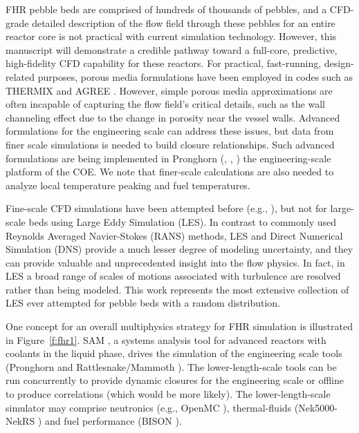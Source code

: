 FHR pebble beds are comprised of hundreds of thousands of pebbles, and a CFD-grade detailed description of the flow field through these pebbles for an entire reactor core is not practical with current simulation technology. However, this manuscript will demonstrate a credible pathway toward a full-core, predictive, high-fidelity CFD capability for these reactors. For practical, fast-running, design-related purposes, porous media formulations have been employed in codes such as THERMIX \cite{cleveland1986application} and AGREE \cite{seker2007multiphysics}. However, simple porous media approximations are often incapable of capturing the flow field's critical details, such as the wall channeling effect due to the change in porosity near the vessel walls.  Advanced formulations for the engineering scale can address these issues, but data from finer scale simulations is needed to build closure relationships. Such advanced formulations are being implemented in  Pronghorn (\cite{novak2018pronghorn}, \cite{novak1}, \cite{novak2}) the engineering-scale platform of the COE. We note that finer-scale calculations are also needed to analyze local temperature peaking and fuel temperatures.

Fine-scale CFD simulations have been attempted before (e.g., \cite{vanstaden2018}), but not for large-scale beds using Large Eddy Simulation (LES).  In contrast to commonly used  Reynolds Averaged Navier-Stokes (RANS) methods, LES and Direct Numerical Simulation (DNS) provide a much lesser degree of modeling uncertainty, and they can provide valuable and unprecedented insight into the flow physics. In fact, in LES a broad range of scales of motions associated with turbulence are resolved rather than being modeled. This work represents the most extensive collection of LES ever attempted for pebble beds with a random distribution.

One concept for an overall multiphysics strategy for FHR simulation is illustrated in Figure~\ref{f:fhr1}. SAM \cite{hu2017sam}, a systems analysis tool for advanced reactors with coolants in the liquid phase, drives the simulation of the engineering scale tools (Pronghorn and Rattlesnake/Mammoth \cite{wang1}). The lower-length-scale tools can be run concurrently to provide dynamic closures for the engineering scale or offline to produce correlations (which would be more likely). The lower-length-scale simulator may comprise neutronics (e.g., OpenMC \cite{romano2013openmc}), thermal-fluids (Nek5000-NekRS \cite{fischer2008}) and fuel performance (BISON \cite{hales2013triso}).

